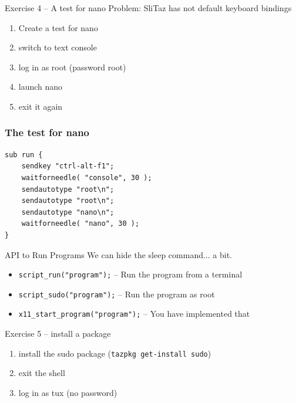 \documentclass{beamer}
\begin{document}
%
%
\begin{frame}{Exercise 4 -- A test for nano}
  Problem: SliTaz has not default keyboard bindings
  \begin{enumerate}
  \item Create a test for nano
  \item switch to text console
  \item log in as root (password root)
  \item launch nano
  \item exit it again
  \end{enumerate}
\end{frame}


\begin{frame}[fragile]
  \frametitle{The test for nano}
  \lstset{style=myperl}
  \begin{lstlisting}
sub run {
    sendkey "ctrl-alt-f1";
    waitforneedle( "console", 30 );
    sendautotype "root\n";
    sendautotype "root\n";
    sendautotype "nano\n";
    waitforneedle( "nano", 30 );
}
  \end{lstlisting}
\end{frame}


\begin{frame}{API to Run Programs}
  We can hide the sleep command... a bit.
  \begin{itemize}
  \item \texttt{script\_run("program");} -- Run the program from a terminal
  \item \texttt{script\_sudo("program");} -- Run the program as root
  \item \texttt{x11\_start\_program("program");} -- You have implemented that
  \end{itemize}
\end{frame}

%
%
\begin{frame}{Exercise 5 -- install a package}
  \begin{enumerate}
    \item install the sudo package (\texttt{tazpkg get-install sudo})
    \item exit the shell
    \item log in as tux (no password)
  \end{enumerate}
\end{frame}
\end{document}

